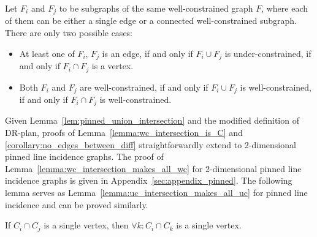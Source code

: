 \begin{lemma}
\label{lem:pinned_union_intersection}
Let $F_i$ and $F_j$ to be subgraphs of the same well-constrained graph $F$,
where each of them can be either  a single edge or a connected well-constrained subgraph.
There are only two possible cases:
\begin{itemize}
\item At least one of $F_i$, $F_j$ is an edge, if and only if $F_i \cup F_j$ is under-constrained, if and only if $F_i \cap F_j$ is a vertex.
\item Both $F_i$ and $F_j$ are well-constrained, if and only if $F_i \cup F_j$ is well-constrained, if and only if $F_i \cap F_j$ is well-constrained.
\end{itemize}
\end{lemma}

Given Lemma~\ref{lem:pinned_union_intersection} and the modified definition of DR-plan,
proofs of Lemma~\ref{lemma:wc_intersection_is_C} and \ref{corollary:no_edges_between_diff} straightforwardly extend to 2-dimensional pinned line incidence graphs.
The proof of Lemma~\ref{lemma:wc_intersection_makes_all_wc} for 2-dimensional pinned line incidence graphs 
is given in Appendix~\ref{sec:appendix_pinned}.
The following lemma serves as Lemma~\ref{lemma:uc_intersection_makes_all_uc} for pinned line incidence and can be proved similarly.
\begin{lemma}
\label{lem:vertex_intersection}
If $C_i\cap C_j$ is a single vertex, then $\forall k: C_i\cap C_k$ is a single vertex.
\end{lemma}

